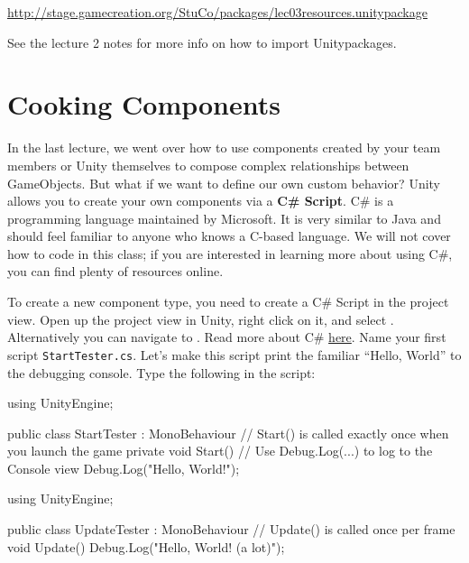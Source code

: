 \documentclass[11pt]{article}
\def\StartLineAt#1{\lstset{firstnumber=#1}}
\begin{document}
\begin{center}
\href{http://stage.gamecreation.org/StuCo/packages/lec03resources.unitypackage}{http://stage.gamecreation.org/StuCo/packages/lec03resources.unitypackage}
\end{center}

\noindent See the lecture 2 notes for more info on how to import Unitypackages.

\pagebreak

\section{Cooking Components}

In the last lecture, we went over how to use components created by your team members or Unity themselves to compose
complex relationships between GameObjects.  But what if we want to define our own custom behavior?  Unity allows you
to create your own components via a \textbf{C\# Script}.  C\# is a programming language maintained by Microsoft.  It is
very similar to Java and should feel familiar to anyone who knows a C-based language.  We will not cover how to code
in this class; if you are interested in learning more about using C\#, you can find plenty of resources online.

To create a new component type, you need to create a C\# Script in the project view.  Open up the project view in Unity,
right click on it, and select .  Alternatively you can navigate to .  Read more about C\# \href{https://docs.microsoft.com/en-us/dotnet/csharp/}{here}.  Name your first script
\lstinline|StartTester.cs|.  Let's make this script print the familiar ``Hello, World'' to the debugging console.  Type
the following in the script:

\StartLineAt{1}
\begin{csharp}
using UnityEngine;

public class StartTester : MonoBehaviour
{
    // Start() is called exactly once when you launch the game
    private void Start()
    {
        // Use Debug.Log(...) to log to the Console view
        Debug.Log("Hello, World!");
    }
}
\end{csharp}


\StartLineAt{1}
\begin{csharp}
using UnityEngine;

public class UpdateTester : MonoBehaviour
{
    // Update() is called once per frame
    void Update()
    {
        Debug.Log("Hello, World! (a lot)");
    }
}
\end{csharp}
\end{document}
